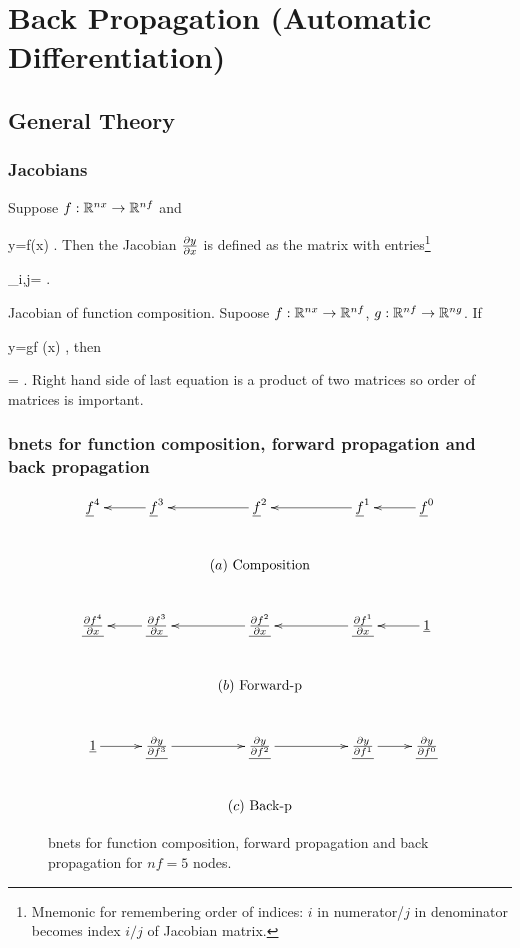 \chapter{Back Propagation
 (Automatic Differentiation)}

\section{General Theory}

\subsection{Jacobians}

Suppose
 $f:{ \mathbb{R}}^{nx}\rightarrow { \mathbb{R}}^{nf}$
and 

\beq
y=f(x)
\;.
\eeq
Then the Jacobian $\frac{\partial y}{\partial x}$
is defined as the matrix with entries\footnote{
Mnemonic for remembering 
order of indices: $i$ in numerator/$j$ in denominator
becomes index $i/j$ of Jacobian matrix.}

\beq
{}_{i,j}=
\;.
\eeq




Jacobian of function composition.
Supoose $f:{ \mathbb{R}}^{nx}\rightarrow{ \mathbb{R}}^{nf}$,
$g:{ \mathbb{R}}^{nf}\rightarrow { \mathbb{R}}^{ng}$. If

\beq
y=g\circ f (x)
\;,
\eeq
then

\beq
{}
=
\;.
\eeq
Right hand side
of last equation 
is a product
of two matrices
so order of matrices is important.

\subsection{
bnets for function
composition, 
forward propagation and back propagation}



\begin{figure}[h!]
\centering
$$
\xymatrix{
\rvf^4
&
\rvf^3\ar[l]
&
\rvf^2\ar[l]
&
\rvf^1\ar[l]
&
\rvf^0\ar[l]
\\
&&\text{$(a)$ Composition}
\\
\ul{\pder{f^4}{x}}
&
\ul{\pder{f^3}{x}}\ar[l]
&
\ul{\pder{f^2}{x}}\ar[l]
&
\ul{\pder{f^1}{x}}\ar[l]
&
\ul{1}\ar[l]
\\
&&\text{$(b)$ Forward-p}
\\
\ul{1}\ar[r]
&
\ul{\pder{y}{f^3}}\ar[r]
&
\ul{\pder{y}{f^2}}\ar[r]
&
\ul{\pder{y}{f^1}}\ar[r]
&
\ul{\pder{y}{f^0}}
\\
&&\text{$(c)$ Back-p}
}
$$
\caption{bnets for function
composition,
forward propagation and back propagation
for $nf=5$ nodes.}
\label{fig-backp-abc}
\end{figure}



